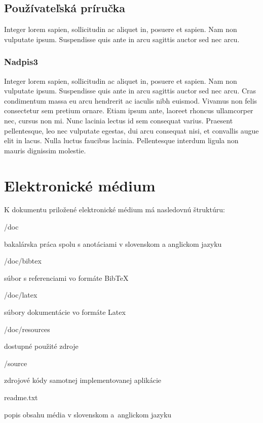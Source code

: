 \newpage
\subsection{Používateľská príručka}
Integer lorem sapien, sollicitudin ac aliquet in, posuere et sapien. Nam non vulputate ipsum. Suspendisse quis ante in arcu sagittis auctor sed nec arcu.

\subsubsection{Nadpis3}
Integer lorem sapien, sollicitudin ac aliquet in, posuere et sapien. Nam non vulputate ipsum. Suspendisse quis ante in arcu sagittis auctor sed nec arcu. Cras condimentum massa eu arcu hendrerit ac iaculis nibh euismod. Vivamus non felis consectetur sem pretium ornare. Etiam ipsum ante, laoreet rhoncus ullamcorper nec, cursus non mi. Nunc lacinia lectus id sem consequat varius. Praesent pellentesque, leo nec vulputate egestas, dui arcu consequat nisi, et convallis augue elit in lacus. Nulla luctus faucibus lacinia. Pellentesque interdum ligula non mauris dignissim molestie.

\newpage
\section{Elektronické médium}

K dokumentu priložené elektronické médium má nasledovnú štruktúru:
\begin{my_itemize}

\emptyitem /doc
    \begin{my_itemize}
    \myitem bakalárska práca spolu s anotáciami v slovenskom a anglickom jazyku
    \end{my_itemize}

\emptyitem /doc/bibtex
    \begin{my_itemize}
    \myitem súbor s referenciami vo formáte BibTeX
    \end{my_itemize}

\emptyitem /doc/latex
    \begin{my_itemize}
    \myitem súbory dokumentácie vo formáte Latex
    \end{my_itemize}

\emptyitem /doc/resources
    \begin{my_itemize}
    \myitem dostupné použité zdroje
    \end{my_itemize}

\emptyitem /source
    \begin{my_itemize}
    \myitem zdrojové kódy samotnej implementovanej aplikácie
    \end{my_itemize}

\emptyitem readme.txt
    \begin{my_itemize}
    \myitem popis obsahu média v slovenskom a~anglickom jazyku
    \end{my_itemize}
\end{my_itemize}

